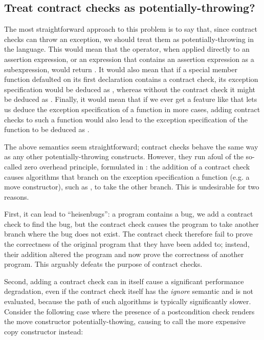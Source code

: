 \subsection{Treat contract checks as potentially-throwing?}

The most straightforward approach to this problem is to say that, since contract checks can throw an exception, we should treat them as potentially-throwing in the language. This would mean that the  operator, when applied directly to an assertion expression, or an expression that contains an assertion expression as a subexpression, would return . It would also mean that if a special member function defaulted on its first declaration contains a contract check, its exception specification would be deduced as , whereas without the contract check it might be deduced as . Finally, it would mean that if we ever get a feature like  that lets us deduce the exception specification of a function in more cases, adding contract checks to such a function would also lead to the exception specification of the function to be deduced as .

The above semantics seem straightforward; contract checks behave the same way as any other potentially-throwing constructs. However, they run afoul of the so-called zero overhead principle, formulated in \cite{P2932R1}: the addition of a contract check causes algorithms that branch on the exception specification a function (e.g. a move constructor), such as \mbox{}, to take the other branch. This is undesirable for two reasons.

First, it can lead to ``heisenbugs'': a program contains a bug, we add a contract check to find the bug, but the contract check causes the program to take another branch where the bug does not exist. The contract check therefore fail to prove the correctness of the original program that they have been added to; instead, their addition altered the program and now prove the correctness of another program. This arguably defeats the purpose of contract checks.

Second, adding a contract check can in itself cause a significant performance degradation, even if the contract check itself has the \emph{ignore} semantic and is not evaluated, because the  path of such algorithms is typically significantly slower. Consider the following case where the presence of a postcondition check renders the move constructor potentially-thowing, causing  to call the more expensive copy constructor instead:

